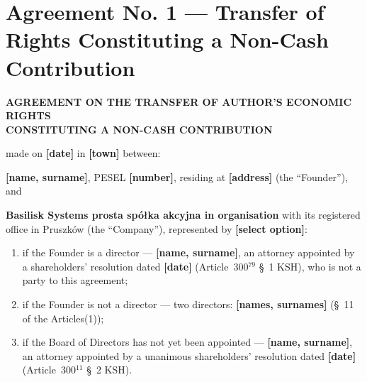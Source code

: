 \documentclass[12pt,a4paper]{report}
\newcounter{paragraf}
\newcommand{\field}[1]{\textbf{[#1]}}
\newcommand{\CompanyFull}{Basilisk Systems prosta spółka akcyjna}
\newcommand{\USen}[1]{\S~#1 of the Articles}
\begin{document}
\chapter*{Agreement No. 1 --- Transfer of Rights Constituting a Non-Cash Contribution}
\setcounter{paragraf}{0}

\begin{center}
{\Large\bfseries AGREEMENT ON THE TRANSFER OF AUTHOR'S ECONOMIC RIGHTS\\ CONSTITUTING A NON-CASH CONTRIBUTION}\par
\vspace{0.4cm}
\end{center}

made on \field{date} in \field{town} between:

\textbf{\field{name, surname}}, PESEL \field{number}, residing at \field{address} (the ``Founder''), and

\textbf{\CompanyFull{} in organisation} with its registered office in Pruszków (the ``Company''), represented by \field{select option}:
\begin{enumerate}[label=\alph*)]
  \item if the Founder is a director --- \field{name, surname}, an attorney appointed by a shareholders' resolution dated \field{date} (Article~300$^{79}$ \S~1 KSH), who is not a party to this agreement;
  \item if the Founder is not a director --- two directors: \field{names, surnames} (\USen{11}(1));
  \item if the Board of Directors has not yet been appointed --- \field{name, surname}, an attorney appointed by a unanimous shareholders' resolution dated \field{date} (Article~300$^{11}$ \S~2 KSH).
\end{enumerate}
\end{document}
